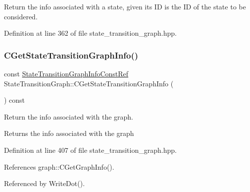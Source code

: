 Return the info associated with a state, given its ID  is the ID of the state to be considered. 



Definition at line 362 of file state\+\_\+transition\+\_\+graph.\+hpp.

\mbox{\label{structStateTransitionGraph_a4b7434612d45f908dbd017de2aa0dc97}} 
\subsubsection{\texorpdfstring{C\+Get\+State\+Transition\+Graph\+Info()}{CGetStateTransitionGraphInfo()}}
{\footnotesize\ttfamily const \hyperlink{state__transition__graph_8hpp_aeebd36a5156ebc171621000ba2c5180d}{State\+Transition\+Graph\+Info\+Const\+Ref} State\+Transition\+Graph\+::\+C\+Get\+State\+Transition\+Graph\+Info (\begin{DoxyParamCaption}{ }\end{DoxyParamCaption}) const\hspace{0.3cm}{\ttfamily [inline]}}



Return the info associated with the graph. 

\begin{DoxyReturn}{Returns}
the info associated with the graph 
\end{DoxyReturn}


Definition at line 407 of file state\+\_\+transition\+\_\+graph.\+hpp.



References graph\+::\+C\+Get\+Graph\+Info().



Referenced by Write\+Dot().

